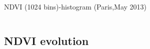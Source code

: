 \documentclass[c]{beamer}
\begin{document}
\begin{frame}
\begin{columns}
\begin{column}{0.33\textwidth}
\begin{overlayarea}{\linewidth}{2cm}
  \end{overlayarea}
  \begin{overlayarea}{\linewidth}{0.5cm}
  \centering
  \tiny NDVI (1024 bins)-histogram (Paris,May 2013) \par
  \end{overlayarea}
 \end{column}
\end{columns}

\end{frame}

\subsection{NDVI evolution}
\begin{frame}
\tableofcontents[currentsubsection]
\end{frame}
\end{document}
